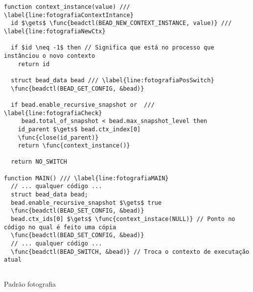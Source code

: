\begin{pseudocode}
\begin{lstlisting}[language=pseudocode, style=pseudocode]
function context_instance(value) /// \label{line:fotografiaContextIntance}
  id $\gets$ \func{beadctl(BEAD_NEW_CONTEXT_INSTANCE, value)} /// \label{line:fotografiaNewCtx}

  if $id \neq -1$ then // Significa que está no processo que instânciou o novo contexto
    return id

  struct bead_data bead /// \label{line:fotografiaPosSwitch}
  \func{beadctl(BEAD_GET_CONFIG, &bead)}

  if bead.enable_recursive_snapshot or  /// \label{line:fotografiaCheck}
     bead.total_of_snapshot < bead.max_snapshot_level then
    id_parent $\gets$ bead.ctx_index[0]
    \func{close(id_parent)}
    return \func{context_instance()}

  return NO_SWITCH

function MAIN() /// \label{line:fotografiaMAIN}
  // ... qualquer código ...
  struct bead_data bead;
  bead.enable_recursive_snapshot $\gets$ true
  \func{beadctl(BEAD_SET_CONFIG, &bead)}
  bead.ctx_ids[0] $\gets$ \func{context_instace(NULL)} // Ponto no código no qual é feito uma cópia
  \func{beadctl(BEAD_SET_CONFIG, &bead)}
  // ... qualquer código ...
  \func{beadctl(BEAD_SWITCH, &bead)} // Troca o contexto de executação atual
  
\end{lstlisting}

  \caption{Padrão fotografia}
  \label{alg:fotografia}
\end{pseudocode}
